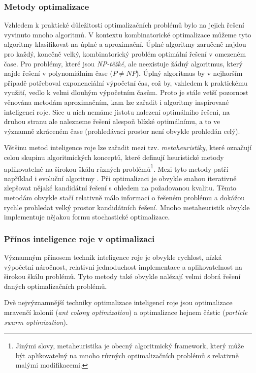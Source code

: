 \documentclass[a4paper,12pt]{article}
\begin{document}
\subsubsection{Metody optimalizace}
Vzhledem k praktické důležitosti optimalizačních problémů bylo na jejich řešení vyvinuto mnoho
algoritmů. V kontextu kombinatorické optimalizace můžeme tyto algoritmy klasifikovat na úplné a
aproximační. Úplné algoritmy zaručeně najdou pro každý, konečně velký, kombinatorický problém
optimální řešení v omezeném čase. Pro problémy, které jsou {\it NP-těžké}, ale neexistuje žádný
algoritmus, který najde řešení v polynomiálním čase ($P\neq NP$). Úplný algoritmus by v nejhorším
případě potřeboval exponenciální výpočetní čas, což by, vzhledem k praktickému využití, vedlo k
velmi dlouhým výpočetním časům. Proto je stále vetší pozornost věnována metodám aproximačním, kam
lze zařadit i algoritmy inspirované inteligencí roje. Sice u nich nemáme jistotu nalezení
optimálního řešení, na druhou stranu ale nalezneme řešení alespoň blízké optimálnímu, a to ve
významně zkráceném čase (prohledávací prostor není obvykle prohledán celý).

Většinu metod inteligence roje lze zařadit mezi tzv. {\it metaheuristiky}, které označují celou skupinu
algoritmických konceptů, které definují heuristické metody aplikovatelné na širokou škálu různých
problémů\footnote{Jinými slovy, metaheuristika je obecný algoritmický framework, který může být aplikovatelný
na mnoho různých optimalizačních problémů s relativně malými modifikacemi.}.
Mezi tyto metody patří například i evoluční algoritmy \cite{Dorigo06antcolony}. Při optimalizaci je obvykle
snahou iterativně zlepšovat nějaké kandidátní řešení s ohledem na požadovanou kvalitu. Těmto
metodám obvykle stačí relativně málo informací o řešeném problému a dokážou rychle prohledat velký
prostor kandidátních řešení. Mnoho metaheuristik obvykle implementuje nějakou formu stochastické
optimalizace.

\subsubsection{Přínos inteligence roje v optimalizaci}
Významným přínosem technik inteligence roje je obvykle rychlost, nízká
výpočetní náročnost, relativní jednoduchost implementace a aplikovatelnost na širokou škálu problémů.
Tyto metody také obvykle nalézají velmi dobrá řešení daných optimalizačních problémů.

Dvě nejvýznamnější techniky optimalizace inteligencí roje jsou optimalizace mravenčí
kolonií ({\it ant colony optimization}) a optimalizace hejnem částic ({\it particle swarm optimization}).
\end{document}
